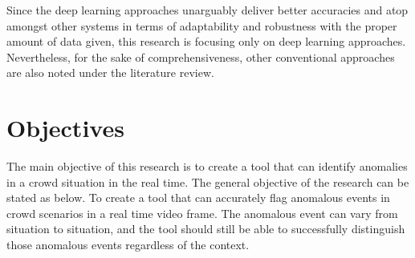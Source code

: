 \documentclass[a4paper,12pt]{report}
\begin{document}
Since the deep learning approaches unarguably deliver better accuracies and  atop amongst other systems in terms of adaptability and robustness with the proper amount of data given, this research is focusing only on deep learning approaches. Nevertheless, for the sake of comprehensiveness, other conventional approaches are also noted under the literature review.

\section{Objectives}

The main objective of this research is to create a tool that can identify anomalies in a  crowd situation in the real time. The general objective of the research can be stated as below.
To create a tool that can accurately flag anomalous events in crowd scenarios in a real time video frame. The anomalous event can vary from situation to situation, and the tool should still be able to successfully distinguish those anomalous events regardless of the context.
\end{document}
